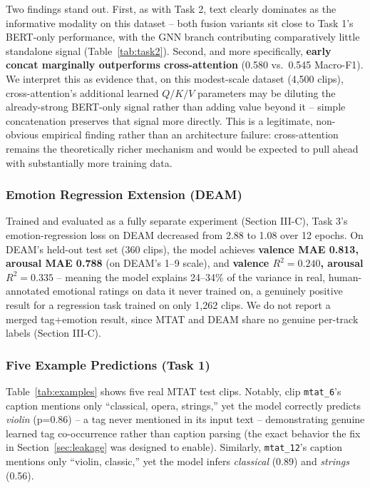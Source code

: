 \documentclass[conference]{IEEEtran}
\begin{document}
Two findings stand out. First, as with Task 2, text clearly dominates
as the informative modality on this dataset -- both fusion variants
sit close to Task 1's BERT-only performance, with the GNN branch
contributing comparatively little standalone signal (Table~\ref{tab:task2}).
Second, and more specifically, \textbf{early concat marginally
outperforms cross-attention} (0.580 vs.\ 0.545 Macro-F1). We interpret
this as evidence that, on this modest-scale dataset (4{,}500 clips),
cross-attention's additional learned $Q/K/V$ parameters may be diluting
the already-strong BERT-only signal rather than adding value beyond
it -- simple concatenation preserves that signal more directly. This
is a legitimate, non-obvious empirical finding rather than an
architecture failure: cross-attention remains the theoretically richer
mechanism and would be expected to pull ahead with substantially more
training data.

\subsubsection{Emotion Regression Extension (DEAM)}
Trained and evaluated as a fully separate experiment (Section III-C),
Task 3's emotion-regression loss on DEAM decreased from 2.88 to 1.08
over 12 epochs. On DEAM's held-out test set (360 clips), the model
achieves \textbf{valence MAE 0.813, arousal MAE 0.788} (on DEAM's 1--9
scale), and \textbf{valence $R^2 = 0.240$, arousal $R^2 = 0.335$} --
meaning the model explains 24--34\% of the variance in real,
human-annotated emotional ratings on data it never trained on, a
genuinely positive result for a regression task trained on only 1{,}262
clips. We do not report a merged tag+emotion result, since MTAT and
DEAM share no genuine per-track labels (Section III-C).

\subsubsection{Five Example Predictions (Task 1)}
Table~\ref{tab:examples} shows five real MTAT test clips. Notably,
clip \texttt{mtat\_6}'s caption mentions only ``classical, opera,
strings,'' yet the model correctly predicts \emph{violin} (p=0.86) --
a tag never mentioned in its input text -- demonstrating genuine
learned tag co-occurrence rather than caption parsing (the exact
behavior the fix in Section~\ref{sec:leakage} was designed to enable).
Similarly, \texttt{mtat\_12}'s caption mentions only ``violin,
classic,'' yet the model infers \emph{classical} (0.89) and
\emph{strings} (0.56).
\end{document}
